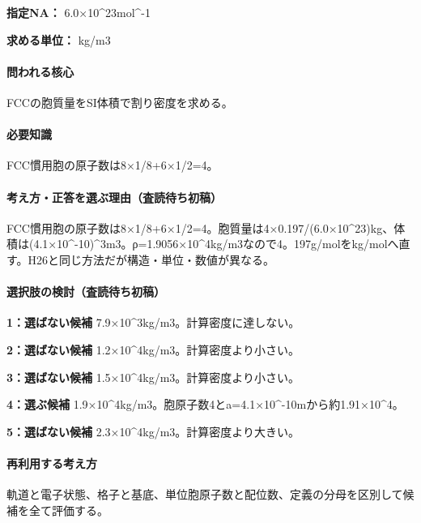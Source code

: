 \noindent\textbf{指定NA：} 6.0×10\textasciicircum{}23mol\textasciicircum{}-1\par

\noindent\textbf{求める単位：} kg/m3\par

\paragraph{問われる核心} FCCの胞質量をSI体積で割り密度を求める。

\paragraph{必要知識} FCC慣用胞の原子数は8×1/8+6×1/2=\allowbreak{}4。

\paragraph{考え方・正答を選ぶ理由（査読待ち初稿）} FCC慣用胞の原子数は8×1/8+6×1/2=\allowbreak{}4。胞質量は4×0.197/(6.0×10\textasciicircum{}23)kg、体積は(4.1×10\textasciicircum{}-10)\textasciicircum{}3m3。ρ=1.9056×10\textasciicircum{}4kg/m3なので4。197g/molをkg/molへ直す。H26と同じ方法だが構造・単位・数値が異なる。

\paragraph{選択肢の検討（査読待ち初稿）}\mbox{}\par

\noindent\textbf{1：選ばない候補} 7.9×10\textasciicircum{}3kg/m3。計算密度に達しない。\par

\noindent\textbf{2：選ばない候補} 1.2×10\textasciicircum{}4kg/m3。計算密度より小さい。\par

\noindent\textbf{3：選ばない候補} 1.5×10\textasciicircum{}4kg/m3。計算密度より小さい。\par

\noindent\textbf{4：選ぶ候補} 1.9×10\textasciicircum{}4kg/m3。胞原子数4とa=\allowbreak{}4.1×10\textasciicircum{}-10mから約1.91×10\textasciicircum{}4。\par

\noindent\textbf{5：選ばない候補} 2.3×10\textasciicircum{}4kg/m3。計算密度より大きい。\par

\paragraph{再利用する考え方} 軌道と電子状態、格子と基底、単位胞原子数と配位数、定義の分母を区別して候補を全て評価する。

